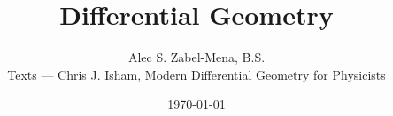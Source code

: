 \documentclass[12pt, twoside]{book}
\title{Differential Geometry}
\author{
  Alec S. Zabel-Mena, B.S. \\
  Texts --- Chris J. Isham, Modern Differential Geometry for
  Physicists \cite{isham1999} \\
}
\date{\today}
\begin{document}
\maketitle
\tableofcontents



\nocite{*}



\end{document}
